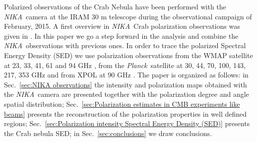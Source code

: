 \documentclass[twocolumn,traditabstract]{aa}
\def\NIKA{\textit{NIKA}}
\def\Planck{\textit{Planck}}
\begin{document}
Polarized observations of the Crab Nebula have been performed with the \NIKA\ camera \citep{monfardini2010,catalano2014,monfardini2014} at the IRAM 30 m telescope during the observational campaign of February, 2015. A first overview in \NIKA\ Crab polarization observations was given in \cite{2016JLTP..184..724R}. In this paper we go a step forward in the analysis and combine the \NIKA\ observations with previous ones.
In order to trace the polarized Spectral Energy Density (SED) we use polarization observations from the WMAP satellite at 23, 33, 41, 61 and 94 GHz \citep{2011ApJS..192...19W}, from the \Planck\ satellite at 30, 44, 70, 100, 143, 217, 353 GHz and from XPOL at 90 GHz \citep{aumont2010}. 
 The paper is organized as follows: in Sec.~\ref{sec:NIKA observations} the intensity and polarization maps obtained with the \NIKA\ camera are presented together with the polarization degree and angle spatial distribution; Sec.~\ref{sec:Polarization estimates in CMB experiments like beams} presents the reconstruction of the polarization properties in well defined regions; Sec.~\ref{sec:Polarization intensity Spectral Energy Density (SED)} presents the Crab nebula SED; in Sec.~\ref{sec:conclusions} we draw conclusions.
\end{document}
